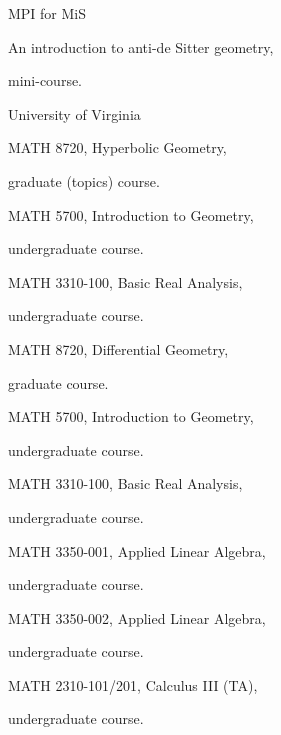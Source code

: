 {MPI for MiS}
{An introduction to anti-de Sitter geometry,
\begin{footnotesize}
	mini-course.
\end{footnotesize}}
{}

\vspace{0.5em}

{University of Virginia}
{MATH 8720, Hyperbolic Geometry, \begin{footnotesize}
		graduate (topics) course.
\end{footnotesize}}
{}

\datedsubsectionnarrow{}
{}
{MATH 5700, Introduction to Geometry,
\begin{footnotesize}
	undergraduate course.
\end{footnotesize}}
{}

{}
{MATH 3310-100, Basic Real Analysis,
\begin{footnotesize}
	undergraduate course.
\end{footnotesize}}
{}



{}
{MATH 8720, Differential Geometry,
\begin{footnotesize}
	graduate course.
\end{footnotesize}}
{}

\datedsubsectionnarrow{}
{}
{MATH 5700, Introduction to Geometry,
\begin{footnotesize}
	undergraduate course.
\end{footnotesize}}
{}

{}
{MATH 3310-100, Basic Real Analysis,
\begin{footnotesize}
	undergraduate course.
\end{footnotesize}}
{}

{}
{MATH 3350-001, Applied Linear Algebra,
\begin{footnotesize}
	undergraduate course.
\end{footnotesize}}
{}

\datedsubsectionnarrow{}
{}
{MATH 3350-002, Applied Linear Algebra,
\begin{footnotesize}
	undergraduate course.
\end{footnotesize}}
{}

{}
{MATH 2310-101/201, Calculus III (TA),
\begin{footnotesize}
	undergraduate course.
\end{footnotesize}}
{}

